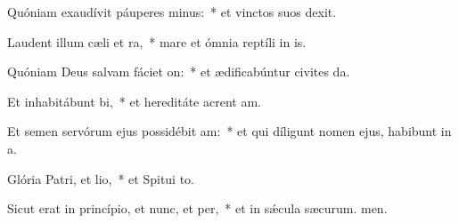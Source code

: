 \item Quóniam exaudívit páuperes minus:~* et vinctos suos  dexit.
\item Laudent illum cæli et ra,~* mare et ómnia reptíli in is.
\item Quóniam Deus salvam fáciet on:~* et ædificabúntur civites da.
\item Et inhabitábunt bi,~* et hereditáte acrent am.
\item Et semen servórum ejus possidébit am:~* et qui díligunt nomen ejus, habibunt in a.
\item Glória Patri, et lio,~* et Spitui to.
\item Sicut erat in princípio, et nunc, et per,~* et in sǽcula sæcurum. men.
